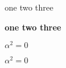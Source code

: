 \documentclass{article}
\begin{document}
one two three

\textbf{one two three}


$\alpha^2=0$

{\boldmath $\alpha^2=0$}
\end{document}
